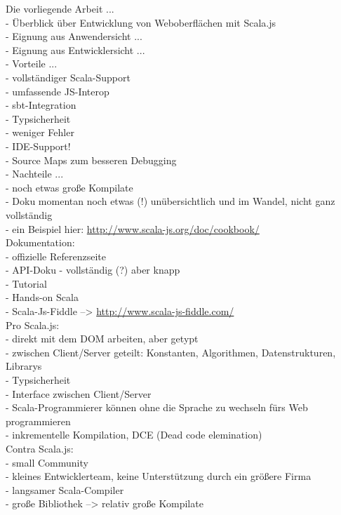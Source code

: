 \documentclass[a4paper, 12pt, hidelinks, listof=totoc, listoftables=totoc, bibliography=totoc]{scrreprt}
\begin{document}
Die vorliegende Arbeit ... \\
- Überblick über Entwicklung von Weboberflächen mit Scala.js \\
- Eignung aus Anwendersicht ... \\
- Eignung aus Entwicklersicht ... \\
- Vorteile ... \\
	- vollständiger Scala-Support \\
	- umfassende JS-Interop \\
	- sbt-Integration \\
	- Typsicherheit \\
		- weniger Fehler \\
		- \ac{IDE}-Support! \\
	- Source Maps zum besseren Debugging \\
- Nachteile ... \\
	- noch etwas große Kompilate \\
	- Doku momentan noch etwas (!) unübersichtlich und im Wandel, nicht ganz vollständig \\
		- ein Beispiel hier: \url{http://www.scala-js.org/doc/cookbook/} \\
		Dokumentation: \\
		- offizielle Referenzseite \\
		- \ac{API}-Doku - vollständig (?) aber knapp \\
		- Tutorial \\
		- Hands-on Scala \\
		- Scala-Js-Fiddle  -->  \url{http://www.scala-js-fiddle.com/} \\

Pro Scala.js: \\
    - direkt mit dem \ac{DOM} arbeiten, aber getypt \\
    - zwischen Client/Server geteilt: Konstanten, Algorithmen, Datenstrukturen, Librarys \\
    - Typsicherheit \\
    - Interface zwischen Client/Server \\
    - Scala-Programmierer können ohne die Sprache zu wechseln fürs Web programmieren \\
    - inkrementelle Kompilation, DCE (Dead code elemination) \\
Contra Scala.js: \\
    - small Community \\
    - kleines Entwicklerteam, keine Unterstützung durch ein größere Firma \\
    - langsamer Scala-Compiler \\
    - große Bibliothek --> relativ große Kompilate \\
\end{document}
